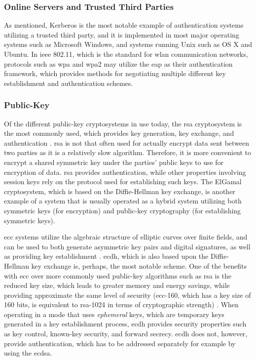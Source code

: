 \subsubsection{Online Servers and Trusted Third Parties}

As mentioned, Kerberos is the most notable example of authentication systems utilizing a trusted third party, and it is implemented in most major operating systems such as Microsoft Windows, and systems running Unix such as OS X and Ubuntu. In \gls{ieee} 802.11, which is the standard for \gls{wlan} communication networks, protocols such as \gls{wpa} and \gls{wpa2} may utilize the \gls{eap} as their authentication framework, which provides methods for negotiating multiple different key establishment and authentication schemes.


\subsubsection{Public-Key}

Of the different public-key cryptosystems in use today, the \gls{rsa} cryptosystem is the most commonly used, which provides key generation, key exchange, and authentication \cite{wander2005energy}. \gls{rsa} is not that often used for actually encrypt data sent between two parties as it is a relatively slow algorithm. Therefore, it is more convenient to encrypt a shared symmetric key under the parties' public keys to use for encryption of data. \gls{rsa} provides authentication, while other properties involving session keys rely on the protocol used for establishing such keys. The ElGamal cryptosystem, which is based on the Diffie-Hellman key exchange, is another example of a system that is usually operated as a hybrid system utilizing both symmetric keys (for encryption) and public-key cryptography (for establishing symmetric keys). 

\gls{ecc} systems utilize the algebraic structure of elliptic curves over finite fields, and can be used to both generate asymmetric key pairs and digital signatures, as well as providing key establishment \cite{bos2014elliptic}. \gls{ecdh}, which is also based upon the Diffie-Hellman key exchange is, perhaps, the most notable scheme. One of the benefits with \gls{ecc} over more commonly used public-key algorithms such as \gls{rsa} is the reduced key size, which leads to greater memory and energy savings, while providing approximate the same level of security (\gls{ecc}-160, which has a key size of 160 bits, is equivalent to \gls{rsa}-1024 in terms of cryptographic strength) \cite{nist2016}. When operating in a mode that uses \emph{ephemeral} keys, which are temporary keys generated in a key establishment process, \gls{ecdh} provides security properties such as key control, known-key security, and forward secrecy. \gls{ecdh} does not, however, provide authentication, which has to be addressed separately for example by using the \gls{ecdsa}. 

